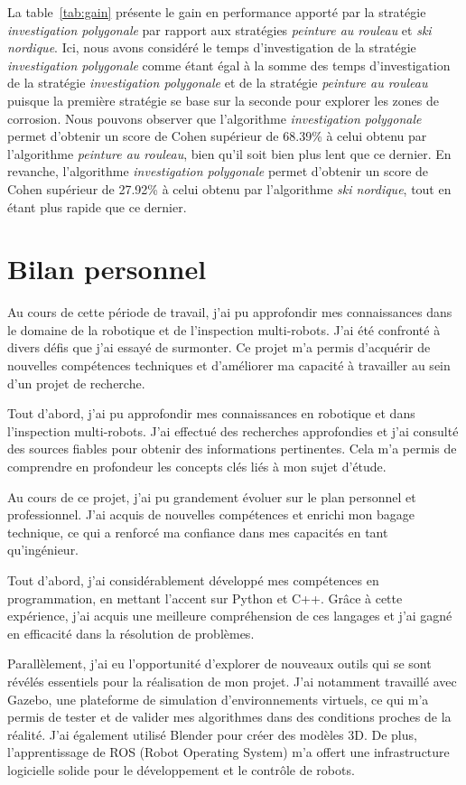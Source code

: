 \documentclass[francais,RandD]{rapportPFE}
\begin{document}
			La table~\ref{tab:gain} présente le gain en performance apporté par la stratégie \textit{investigation polygonale} par rapport aux stratégies \textit{peinture au rouleau} et \textit{ski nordique}.
			Ici, nous avons considéré le temps d'investigation de la stratégie \textit{investigation polygonale} comme étant égal à la somme des temps d'investigation de la stratégie \textit{investigation polygonale} et de la stratégie \textit{peinture au rouleau} puisque la première stratégie se base sur la seconde pour explorer les zones de corrosion.
			Nous pouvons observer que l'algorithme \textit{investigation polygonale} permet d'obtenir un score de Cohen supérieur de 68.39\% à celui obtenu par l'algorithme \textit{peinture au rouleau}, bien qu'il soit bien plus lent que ce dernier.
			En revanche, l'algorithme \textit{investigation polygonale} permet d'obtenir un score de Cohen supérieur de 27.92\% à celui obtenu par l'algorithme \textit{ski nordique}, tout en étant plus rapide que ce dernier.
	\section{Bilan personnel}
		Au cours de cette période de travail, j'ai pu approfondir mes connaissances dans le domaine de la robotique et de l'inspection multi-robots.
		J'ai été confronté à divers défis que j'ai essayé de surmonter.
		Ce projet m'a permis d'acquérir de nouvelles compétences techniques et d'améliorer ma capacité à travailler au sein d'un projet de recherche.

		Tout d'abord, j'ai pu approfondir mes connaissances en robotique et dans l'inspection multi-robots.
		J'ai effectué des recherches approfondies et j'ai consulté des sources fiables pour obtenir des informations pertinentes.
		Cela m'a permis de comprendre en profondeur les concepts clés liés à mon sujet d'étude.

		Au cours de ce projet, j'ai pu grandement évoluer sur le plan personnel et professionnel.
		J'ai acquis de nouvelles compétences et enrichi mon bagage technique, ce qui a renforcé ma confiance dans mes capacités en tant qu'ingénieur.

		Tout d'abord, j'ai considérablement développé mes compétences en programmation, en mettant l'accent sur Python et C++.
		Grâce à cette expérience, j'ai acquis une meilleure compréhension de ces langages et j'ai gagné en efficacité dans la résolution de problèmes.

		Parallèlement, j'ai eu l'opportunité d'explorer de nouveaux outils qui se sont révélés essentiels pour la réalisation de mon projet.
		J'ai notamment travaillé avec Gazebo, une plateforme de simulation d'environnements virtuels, ce qui m'a permis de tester et de valider mes algorithmes dans des conditions proches de la réalité.
		J'ai également utilisé Blender pour créer des modèles 3D. De plus, l'apprentissage de ROS (Robot Operating System) m'a offert une infrastructure logicielle solide pour le développement et le contrôle de robots.
\end{document}

